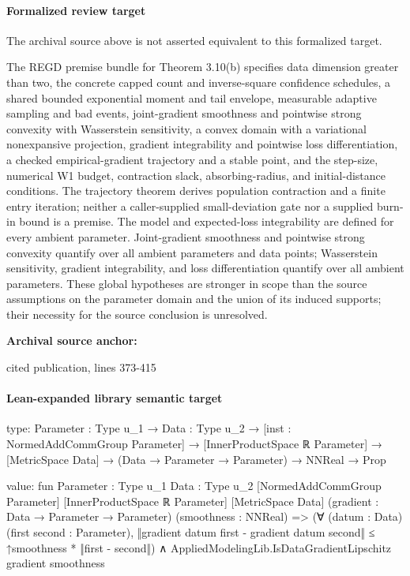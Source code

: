 \documentclass[10pt]{article}
\begin{document}
\paragraph{Formalized review target}
The archival source above is not asserted equivalent to this formalized target.
\begin{ReviewVerbatim}
The REGD premise bundle for Theorem 3.10(b) specifies data dimension greater than two, the concrete capped count and inverse-square confidence schedules, a shared bounded exponential moment and tail envelope, measurable adaptive sampling and bad events, joint-gradient smoothness and pointwise strong convexity with Wasserstein sensitivity, a convex domain with a variational nonexpansive projection, gradient integrability and pointwise loss differentiation, a checked empirical-gradient trajectory and a stable point, and the step-size, numerical W1 budget, contraction slack, absorbing-radius, and initial-distance conditions. The trajectory theorem derives population contraction and a finite entry iteration; neither a caller-supplied small-deviation gate nor a supplied burn-in bound is a premise. The model and expected-loss integrability are defined for every ambient parameter. Joint-gradient smoothness and pointwise strong convexity quantify over all ambient parameters and data points; Wasserstein sensitivity, gradient integrability, and loss differentiation quantify over all ambient parameters. These global hypotheses are stronger in scope than the source assumptions on the parameter domain and the union of its induced supports; their necessity for the source conclusion is unresolved.
\end{ReviewVerbatim}

\textbf{Archival source anchor:} {\footnotesize\raggedright cited publication, lines 373-\allowbreak{}415\par}
\paragraph{Lean-expanded library semantic target}
\begin{ReviewVerbatim}
type:
{Parameter : Type u_1} →
  {Data : Type u_2} →
    [inst : NormedAddCommGroup Parameter] →
      [InnerProductSpace ℝ Parameter] → [MetricSpace Data] → (Data → Parameter → Parameter) → NNReal → Prop

value:
fun {Parameter : Type u_1} {Data : Type u_2} [NormedAddCommGroup Parameter] [InnerProductSpace ℝ Parameter]
    [MetricSpace Data] (gradient : Data → Parameter → Parameter) (smoothness : NNReal) =>
  (∀ (datum : Data) (first second : Parameter),
      ‖gradient datum first - gradient datum second‖ ≤ ↑smoothness * ‖first - second‖) ∧
    AppliedModelingLib.IsDataGradientLipschitz gradient smoothness
\end{ReviewVerbatim}
\end{document}
